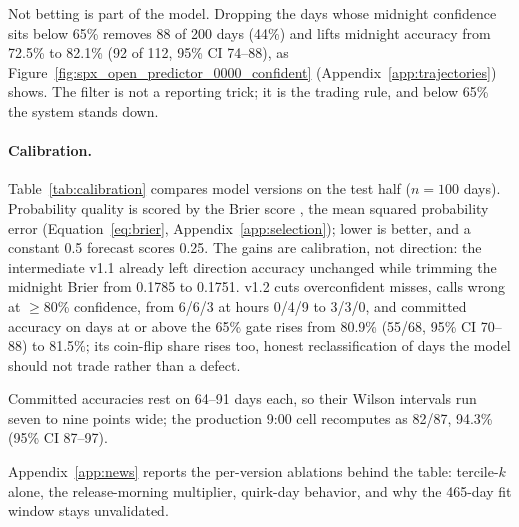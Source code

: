 Not betting is part of the model. Dropping the days whose midnight confidence
sits below 65\% removes 88 of 200 days (44\%) and lifts midnight accuracy
from 72.5\% to 82.1\% (92 of 112, 95\% CI 74--88), as
Figure~\ref{fig:spx_open_predictor_0000_confident}
(Appendix~\ref{app:trajectories}) shows. The filter is not a
reporting trick; it is the trading rule, and below 65\% the system stands
down.

\paragraph{Calibration.}
Table~\ref{tab:calibration} compares model versions on the test half
($n=100$ days). Probability quality is scored by the Brier score
\citep{brier1950}, the mean squared probability error
(Equation~\ref{eq:brier}, Appendix~\ref{app:selection}); lower is better,
and a constant 0.5 forecast scores 0.25. The gains are
calibration, not direction: the intermediate
v1.1 already left direction accuracy unchanged while trimming the midnight
Brier from 0.1785 to 0.1751. v1.2 cuts
overconfident misses, calls wrong at $\geq$80\% confidence, from 6/6/3 at
hours 0/4/9 to 3/3/0, and committed accuracy on days at or above the 65\%
gate rises from 80.9\% (55/68, 95\% CI 70--88) to 81.5\%; its coin-flip share rises too, honest
reclassification of days the model should not trade rather than a defect.

Committed accuracies rest on 64--91 days each, so their Wilson intervals run
seven to nine points wide; the production 9:00 cell recomputes as 82/87,
94.3\% (95\% CI 87--97).

Appendix~\ref{app:news} reports the per-version ablations behind the
table: tercile-$k$ alone, the release-morning multiplier, quirk-day
behavior, and why the 465-day fit window stays unvalidated.


